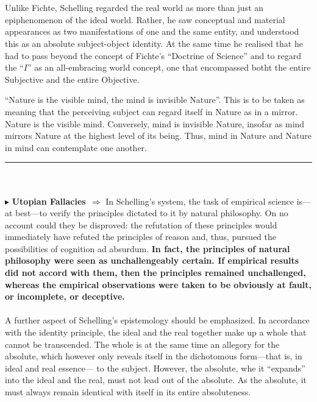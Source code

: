 \documentclass[10pt]{article}
\newcommand{\newpoint}[1]{\indent $\blacktriangleright$ \textbf{#1}$\ \ \Rightarrow$}
\newcommand{\divider}{\par\noindent\rule{\textwidth}{0.4pt}\\ \ \\}
\begin{document}
            \\
            \\
            Unlike Fichte, Schelling regarded the real world as more than just an epiphenomenon of the ideal world. Rather, he saw conceptual and material appearances as two manifestations of one and the same entity, and understood this as an absolute subject-object identity. At the same time he realised that he had to pass beyond the concept of Fichte's “Doctrine of Science” and to regard the “$I$” as an all-embracing world concept, one that encompassed botht the entire Subjective and the entire Objective. 
            \begin{qt}
                “Nature is the visible mind, the mind is invisible Nature”. This is to be taken as meaning that the perceiving subject can regard itself in Nature as in a mirror. Nature is the visible mind. Conversely, mind is invisible Nature, insofar as mind mirrors Nature at the highest level of its being. Thus, mind in Nature and Nature in mind can contemplate one another.
            \end{qt}
            \divider
            \newpoint{Utopian Fallacies}
            In Schelling's system, the task of empirical science is—at best—to verify the principles dictated to it by natural philosophy. On no account could they be disproved: the refutation of these principles would immediately have refuted the principles of reason and, thus, pursued the possibilities of cognition ad absurdum. \textbf{In fact, the principles of natural philosophy were seen as unchallengeably certain. If empirical results did not accord with them, then the principles remained unchallenged, whereas the empirical observations were taken to be obviously at fault, or incomplete, or deceptive.}
            \\
            \\
            A further aspect of Schelling's epistemology should be emphasized. In accordance with the identity principle, the ideal and the real together make up a whole that cannot be transcended. The whole is at the same time an allegory for the absolute, which however only reveals itself in the dichotomous form—that is, in ideal and real essence— to the subject. However, the absolute, whe it “expands” into the ideal and the real, must not lead out of the absolute. As the absolute, it must always remain identical with itself in its entire absoluteness.
\end{document}
